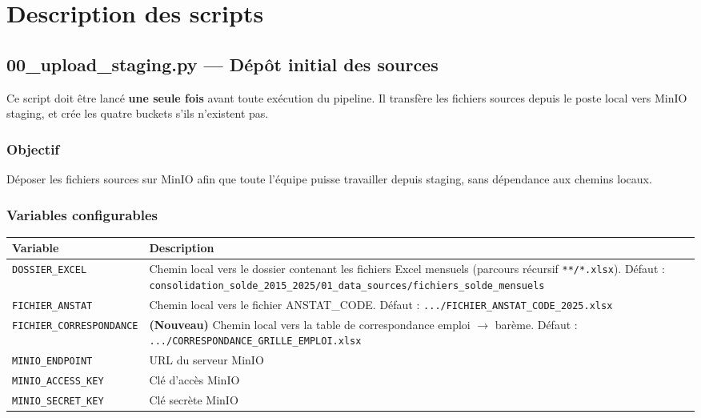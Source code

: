 \documentclass[12pt,a4paper,french]{report}
\begin{document}
\chapter{Description des scripts}

\section{00\_upload\_staging.py — Dépôt initial des sources}

\begin{warningbox}
  Ce script doit être lancé \textbf{une seule fois} avant toute exécution du
  pipeline. Il transfère les fichiers sources depuis le poste local vers
  MinIO staging, et crée les quatre buckets s'ils n'existent pas.
\end{warningbox}

\subsection{Objectif}

Déposer les fichiers sources sur MinIO afin que toute l'équipe puisse
travailler depuis staging, sans dépendance aux chemins locaux.

\subsection{Variables configurables}

\begin{tabularx}{\textwidth}{lX}
  \toprule
  \textbf{Variable} & \textbf{Description} \\
  \midrule
  \texttt{DOSSIER\_EXCEL} &
    Chemin local vers le dossier contenant les fichiers Excel mensuels
    (parcours récursif \texttt{**/*.xlsx}).
    Défaut : \texttt{consolidation\_solde\_2015\_2025/01\_data\_sources/fichiers\_solde\_mensuels} \\
  \texttt{FICHIER\_ANSTAT} &
    Chemin local vers le fichier ANSTAT\_CODE.
    Défaut : \texttt{.../FICHIER\_ANSTAT\_CODE\_2025.xlsx} \\
  \texttt{FICHIER\_CORRESPONDANCE} &
    \textbf{(Nouveau)} Chemin local vers la table de correspondance
    emploi $\rightarrow$ barème.
    Défaut : \texttt{.../CORRESPONDANCE\_GRILLE\_EMPLOI.xlsx} \\
  \texttt{MINIO\_ENDPOINT} & URL du serveur MinIO \\
  \texttt{MINIO\_ACCESS\_KEY} & Clé d'accès MinIO \\
  \texttt{MINIO\_SECRET\_KEY} & Clé secrète MinIO \\
  \bottomrule
\end{tabularx}
\end{document}
